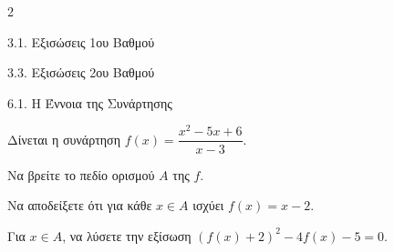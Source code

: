 \begin{ylh}{2}
    \item 3.1. Εξισώσεις 1ου Βαθμού
    \item 3.3. Εξισώσεις 2ου Βαθμού
    \item 6.1. Η Έννοια της Συνάρτησης
\end{ylh}
Δίνεται η συνάρτηση $f(x) = \dfrac{x^2 - 5x + 6}{x - 3}$.
\begin{alist}
\item Να βρείτε το πεδίο ορισμού ${A}$ της $f$.
\item Να αποδείξετε ότι για κάθε $x \in {A}$ ισχύει $f(x) = x - 2$.
\item Για $x \in {A}$, να λύσετε την εξίσωση $(f(x) + 2)^2 - 4f(x) - 5 = 0$.
\end{alist}

